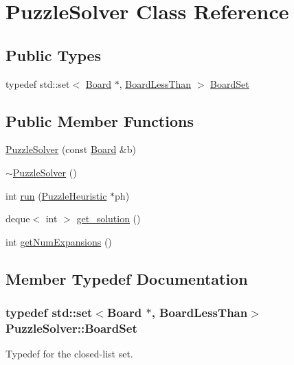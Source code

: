 \hypertarget{classPuzzleSolver}{\section{\-Puzzle\-Solver \-Class \-Reference}
\label{classPuzzleSolver}
}
\subsection*{\-Public \-Types}
\begin{DoxyCompactItemize}
\item 
typedef std\-::set$<$ \hyperlink{classBoard}{\-Board} \*
$\ast$, \hyperlink{structBoardLessThan}{\-Board\-Less\-Than} $>$ \hyperlink{classPuzzleSolver_a868921fe5292af6190a7bc068e32a2c7}{\-Board\-Set}
\end{DoxyCompactItemize}
\subsection*{\-Public \-Member \-Functions}
\begin{DoxyCompactItemize}
\item 
\hyperlink{classPuzzleSolver_a70e86dbac90a3c6567598cb02fc523f2}{\-Puzzle\-Solver} (const \hyperlink{classBoard}{\-Board} \&b)
\item 
\hyperlink{classPuzzleSolver_adcc789feca768f7d468f6ca8806f75a3}{$\sim$\-Puzzle\-Solver} ()
\item 
int \hyperlink{classPuzzleSolver_a99e867d21204e8958f0bdfbcbbd01c5f}{run} (\hyperlink{classPuzzleHeuristic}{\-Puzzle\-Heuristic} $\ast$ph)
\item 
deque$<$ int $>$ \hyperlink{classPuzzleSolver_a92a5a1bba3ca6bc46d44d26b9bcf41cc}{get\-\_\-solution} ()
\item 
int \hyperlink{classPuzzleSolver_a2aa96aa4631d4a4b295fddf49e5dd9f7}{get\-Num\-Expansions} ()
\end{DoxyCompactItemize}


\subsection{\-Member \-Typedef \-Documentation}
\hypertarget{classPuzzleSolver_a868921fe5292af6190a7bc068e32a2c7}{
\subsubsection[{\-Board\-Set}]{\setlength{\rightskip}{0pt plus 5cm}typedef std\-::set$<${\bf \-Board} $\ast$, {\bf \-Board\-Less\-Than}$>$ {\bf \-Puzzle\-Solver\-::\-Board\-Set}}}\label{classPuzzleSolver_a868921fe5292af6190a7bc068e32a2c7}
\-Typedef for the closed-\/list set. 

